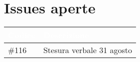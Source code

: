 \documentclass{classes/base}
\begin{document}
    \section*{Issues aperte}
    {
        
        \newlength{\freewidth}
        \setlength{\freewidth}{\dimexpr\textwidth-10\tabcolsep}
        \renewcommand{\arraystretch}{1.5}
        \centering
        \setlength{\aboverulesep}{0pt}
        \setlength{\belowrulesep}{0pt}
        \begin{longtable}{C{.13\freewidth} C{\freewidth}}
            \toprule
        \textcolor{white}{\textbf{Codice}}&
        \textcolor{white}{\textbf{Descrizione}}\\	
        \toprule
        \endhead
        
        \#116 & Stesura verbale 31 agosto \\

        \bottomrule
        \end{longtable}
    }
\end{document}
